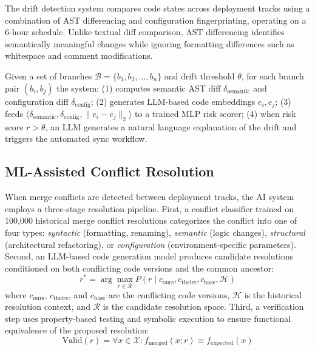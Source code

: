 \documentclass[journal]{IEEEtran}
\begin{document}
The drift detection system compares code states across deployment tracks using a combination of AST differencing and configuration fingerprinting, operating on a 6-hour schedule. Unlike textual diff comparison, AST differencing identifies semantically meaningful changes while ignoring formatting differences such as whitespace and comment modifications.

Given a set of branches $\mathcal{B} = \{b_1, b_2, \ldots, b_n\}$ and drift threshold $\theta$, for each branch pair $(b_i, b_j)$ the system: (1) computes semantic AST diff $\delta_{\text{semantic}}$ and configuration diff $\delta_{\text{config}}$; (2) generates LLM-based code embeddings $e_i, e_j$; (3) feeds $\langle \delta_{\text{semantic}}, \delta_{\text{config}}, \|e_i - e_j\|_2 \rangle$ to a trained MLP risk scorer; (4) when risk score $r > \theta$, an LLM generates a natural language explanation of the drift and triggers the automated sync workflow.

\subsection{ML-Assisted Conflict Resolution}

When merge conflicts are detected between deployment tracks, the AI system employs a three-stage resolution pipeline. First, a conflict classifier trained on 100,000 historical merge conflict resolutions categorizes the conflict into one of four types: \textit{syntactic} (formatting, renaming), \textit{semantic} (logic changes), \textit{structural} (architectural refactoring), or \textit{configuration} (environment-specific parameters). Second, an LLM-based code generation model produces candidate resolutions conditioned on both conflicting code versions and the common ancestor:
\begin{equation}
r^* = \arg\max_{r \in \mathcal{R}} P(r \mid c_{\text{ours}}, c_{\text{theirs}}, c_{\text{base}}, \mathcal{H})
\label{eq:resolution}
\end{equation}
where $c_{\text{ours}}$, $c_{\text{theirs}}$, and $c_{\text{base}}$ are the conflicting code versions, $\mathcal{H}$ is the historical resolution context, and $\mathcal{R}$ is the candidate resolution space. Third, a verification step uses property-based testing and symbolic execution to ensure functional equivalence of the proposed resolution:
\begin{equation}
\text{Valid}(r) = \forall x \in \mathcal{X}: f_{\text{merged}}(x; r) \equiv f_{\text{expected}}(x)
\label{eq:verify}
\end{equation}
\end{document}
